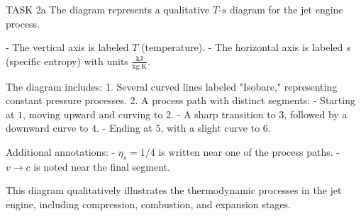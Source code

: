 TASK 2a  
The diagram represents a qualitative \( T \)-\( s \) diagram for the jet engine process.  

- The vertical axis is labeled \( T \) (temperature).  
- The horizontal axis is labeled \( s \) (specific entropy) with units \( \frac{\text{kJ}}{\text{kg·K}} \).  

The diagram includes:  
1. Several curved lines labeled "Isobare," representing constant pressure processes.  
2. A process path with distinct segments:  
   - Starting at \( 1 \), moving upward and curving to \( 2 \).  
   - A sharp transition to \( 3 \), followed by a downward curve to \( 4 \).  
   - Ending at \( 5 \), with a slight curve to \( 6 \).  

Additional annotations:  
- \( \eta_s = 1/4 \) is written near one of the process paths.  
- \( v \to c \) is noted near the final segment.  

This diagram qualitatively illustrates the thermodynamic processes in the jet engine, including compression, combustion, and expansion stages.